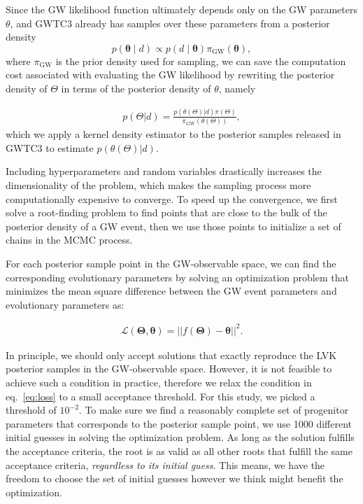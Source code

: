 \documentclass[twocolumn]{aastex631}
\begin{document}
Since the GW likelihood function
ultimately depends only on the GW parameters $\theta$, and GWTC3 already has samples over these parameters from a posterior density 
\begin{equation}
    p\left( \bm{\theta} \mid d \right) \propto p\left( d \mid \bm{\theta} \right) \pi_\mathrm{GW} \left( \bm{\theta} \right),
\end{equation}
where $\pi_\mathrm{GW}$ is the prior density used for sampling,
we can save the computation cost associated with evaluating the GW likelihood by rewriting the posterior 
density of $\Theta$ in terms of the posterior density of $\theta$, namely

\begin{align}
    p(\Theta | d) = \frac{p(\theta(\Theta)| d) \pi(\Theta)}{\pi_\mathrm{GW}(\theta(\Theta))},
\end{align}
which we apply a kernel density estimator to the posterior samples released in GWTC3 to estimate $p(\theta(\Theta)|d)$.

Including hyperparameters and random variables %
drastically increases the dimensionality of the problem,
which makes the sampling process more computationally expensive to converge.
To speed up the convergence, we first solve a root-finding problem to find points that are close to the bulk of the posterior density of a GW event,
then we use those points to initialize a set of chains in the MCMC process.

For each posterior sample point in the GW-observable space,
we can find the corresponding evolutionary parameters by solving an optimization problem that minimizes 
the mean square difference between the GW event parameters and evolutionary parameters as:

\begin{align}
\mathcal{L}(\bm{\Theta},\bm{\theta}) = ||f(\bm{\Theta})-\bm{\theta}||^2.
\label{eq:loss}
\end{align}

In principle, we should only accept solutions that exactly reproduce the LVK posterior samples in the GW-observable space.
However, it is not feasible to achieve such a condition in practice, therefore we relax the condition in eq.~\ref{eq:loss} 
to a small acceptance threshold. For this study, we picked a threshold of $10^{-2}$. To make sure we find a reasonably 
complete set of progenitor parameters that corresponds to the posterior sample point, we use 1000 different initial guesses 
in solving the optimization problem. As long as the solution fulfills the acceptance criteria, the root is as valid as all 
other roots that fulfill the same acceptance criteria, \emph{regardless to its initial guess}.
This means, we have the freedom to choose the set of initial guesses however we think might benefit the optimization.
\end{document}
